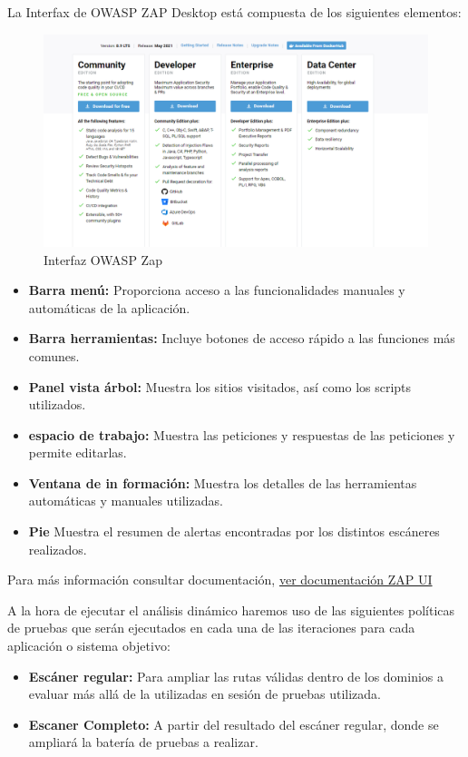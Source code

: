 La Interfax de OWASP ZAP Desktop está compuesta de los siguientes elementos:
\begin{figure}[h!]  
    \includegraphics[width=\linewidth]{./imagenes/02_SonarQubeEditions.png}
    \caption{Interfaz OWASP Zap}  
    \label{fig:Interfaz OWASP Zap}
\end{figure}

\begin{itemize}
    \item \textbf{Barra menú:} Proporciona acceso a las funcionalidades manuales y automáticas de la aplicación.
    \item \textbf{Barra herramientas:} Incluye botones de acceso rápido a las funciones más comunes.
    \item \textbf{Panel vista árbol:} Muestra los sitios visitados, así como los scripts utilizados.
    \item \textbf{espacio de trabajo:} Muestra las peticiones y respuestas de las peticiones y permite editarlas.
    \item \textbf{Ventana de in formación:} Muestra los detalles de las herramientas automáticas y manuales utilizadas. 
    \item \textbf{Pie} Muestra el resumen de alertas encontradas por los distintos escáneres realizados.
\end{itemize}

Para más información consultar documentación, \href{https://www.zaproxy.org/docs/desktop/ui/}{ver documentación ZAP UI}

A la hora de ejecutar el análisis dinámico haremos uso de las siguientes políticas de pruebas 
que serán ejecutados en cada una de las iteraciones para cada aplicación o sistema objetivo:

\begin{itemize}
    \item \textbf{Escáner regular:} Para ampliar las rutas válidas dentro de los dominios a evaluar más allá de la utilizadas en sesión de pruebas utilizada.
    \item \textbf{Escaner Completo:} A partir del resultado del escáner regular, donde se ampliará la batería de pruebas a realizar.
\end{itemize}